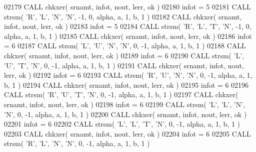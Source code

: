 \begin{DoxyCode}
02179       \textcolor{keyword}{CALL }chkxer( srnamt, infot, nout, lerr, ok )
02180       infot = 5
02181       \textcolor{keyword}{CALL }strsm( \textcolor{stringliteral}{'R'}, \textcolor{stringliteral}{'L'}, \textcolor{stringliteral}{'N'}, \textcolor{stringliteral}{'N'}, -1, 0, alpha, a, 1, b, 1 )
02182       \textcolor{keyword}{CALL }chkxer( srnamt, infot, nout, lerr, ok )
02183       infot = 5
02184       \textcolor{keyword}{CALL }strsm( \textcolor{stringliteral}{'R'}, \textcolor{stringliteral}{'L'}, \textcolor{stringliteral}{'T'}, \textcolor{stringliteral}{'N'}, -1, 0, alpha, a, 1, b, 1 )
02185       \textcolor{keyword}{CALL }chkxer( srnamt, infot, nout, lerr, ok )
02186       infot = 6
02187       \textcolor{keyword}{CALL }strsm( \textcolor{stringliteral}{'L'}, \textcolor{stringliteral}{'U'}, \textcolor{stringliteral}{'N'}, \textcolor{stringliteral}{'N'}, 0, -1, alpha, a, 1, b, 1 )
02188       \textcolor{keyword}{CALL }chkxer( srnamt, infot, nout, lerr, ok )
02189       infot = 6
02190       \textcolor{keyword}{CALL }strsm( \textcolor{stringliteral}{'L'}, \textcolor{stringliteral}{'U'}, \textcolor{stringliteral}{'T'}, \textcolor{stringliteral}{'N'}, 0, -1, alpha, a, 1, b, 1 )
02191       \textcolor{keyword}{CALL }chkxer( srnamt, infot, nout, lerr, ok )
02192       infot = 6
02193       \textcolor{keyword}{CALL }strsm( \textcolor{stringliteral}{'R'}, \textcolor{stringliteral}{'U'}, \textcolor{stringliteral}{'N'}, \textcolor{stringliteral}{'N'}, 0, -1, alpha, a, 1, b, 1 )
02194       \textcolor{keyword}{CALL }chkxer( srnamt, infot, nout, lerr, ok )
02195       infot = 6
02196       \textcolor{keyword}{CALL }strsm( \textcolor{stringliteral}{'R'}, \textcolor{stringliteral}{'U'}, \textcolor{stringliteral}{'T'}, \textcolor{stringliteral}{'N'}, 0, -1, alpha, a, 1, b, 1 )
02197       \textcolor{keyword}{CALL }chkxer( srnamt, infot, nout, lerr, ok )
02198       infot = 6
02199       \textcolor{keyword}{CALL }strsm( \textcolor{stringliteral}{'L'}, \textcolor{stringliteral}{'L'}, \textcolor{stringliteral}{'N'}, \textcolor{stringliteral}{'N'}, 0, -1, alpha, a, 1, b, 1 )
02200       \textcolor{keyword}{CALL }chkxer( srnamt, infot, nout, lerr, ok )
02201       infot = 6
02202       \textcolor{keyword}{CALL }strsm( \textcolor{stringliteral}{'L'}, \textcolor{stringliteral}{'L'}, \textcolor{stringliteral}{'T'}, \textcolor{stringliteral}{'N'}, 0, -1, alpha, a, 1, b, 1 )
02203       \textcolor{keyword}{CALL }chkxer( srnamt, infot, nout, lerr, ok )
02204       infot = 6
02205       \textcolor{keyword}{CALL }strsm( \textcolor{stringliteral}{'R'}, \textcolor{stringliteral}{'L'}, \textcolor{stringliteral}{'N'}, \textcolor{stringliteral}{'N'}, 0, -1, alpha, a, 1, b, 1 )

\end{DoxyCode}
